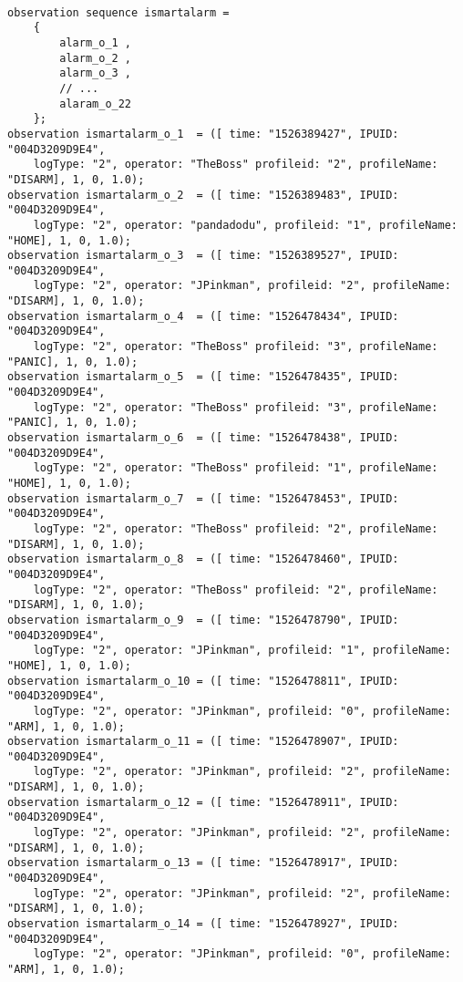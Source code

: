 \documentclass{easychair}
\begin{document}
\lstset{language=Lucid}
\lstset{frame=lines}
\lstset{basicstyle=\footnotesize}
\begin{lstlisting}

observation sequence ismartalarm =
	{	
		alarm_o_1 ,
		alarm_o_2 ,
		alarm_o_3 ,
		// ...
		alaram_o_22
	};
observation ismartalarm_o_1	 = ([ time: "1526389427", IPUID: "004D3209D9E4",
	logType: "2", operator: "TheBoss" profileid: "2", profileName: "DISARM], 1, 0, 1.0);
observation ismartalarm_o_2	 = ([ time: "1526389483", IPUID: "004D3209D9E4",
	logType: "2", operator: "pandadodu", profileid: "1", profileName: "HOME], 1, 0, 1.0);
observation ismartalarm_o_3	 = ([ time: "1526389527", IPUID: "004D3209D9E4",
	logType: "2", operator: "JPinkman", profileid: "2", profileName: "DISARM], 1, 0, 1.0);
observation ismartalarm_o_4	 = ([ time: "1526478434", IPUID: "004D3209D9E4",
	logType: "2", operator: "TheBoss" profileid: "3", profileName: "PANIC], 1, 0, 1.0);
observation ismartalarm_o_5	 = ([ time: "1526478435", IPUID: "004D3209D9E4",
	logType: "2", operator: "TheBoss" profileid: "3", profileName: "PANIC], 1, 0, 1.0);
observation ismartalarm_o_6	 = ([ time: "1526478438", IPUID: "004D3209D9E4",
	logType: "2", operator: "TheBoss" profileid: "1", profileName: "HOME], 1, 0, 1.0);
observation ismartalarm_o_7	 = ([ time: "1526478453", IPUID: "004D3209D9E4",
	logType: "2", operator: "TheBoss" profileid: "2", profileName: "DISARM], 1, 0, 1.0);
observation ismartalarm_o_8	 = ([ time: "1526478460", IPUID: "004D3209D9E4",
	logType: "2", operator: "TheBoss" profileid: "2", profileName: "DISARM], 1, 0, 1.0);
observation ismartalarm_o_9	 = ([ time: "1526478790", IPUID: "004D3209D9E4",
	logType: "2", operator: "JPinkman", profileid: "1", profileName: "HOME], 1, 0, 1.0);
observation ismartalarm_o_10 = ([ time: "1526478811", IPUID: "004D3209D9E4",
	logType: "2", operator: "JPinkman", profileid: "0", profileName: "ARM], 1, 0, 1.0);
observation ismartalarm_o_11 = ([ time: "1526478907", IPUID: "004D3209D9E4",
	logType: "2", operator: "JPinkman", profileid: "2", profileName: "DISARM], 1, 0, 1.0);
observation ismartalarm_o_12 = ([ time: "1526478911", IPUID: "004D3209D9E4",
	logType: "2", operator: "JPinkman", profileid: "2", profileName: "DISARM], 1, 0, 1.0);
observation ismartalarm_o_13 = ([ time: "1526478917", IPUID: "004D3209D9E4",
	logType: "2", operator: "JPinkman", profileid: "2", profileName: "DISARM], 1, 0, 1.0);
observation ismartalarm_o_14 = ([ time: "1526478927", IPUID: "004D3209D9E4",
	logType: "2", operator: "JPinkman", profileid: "0", profileName: "ARM], 1, 0, 1.0);

\end{lstlisting}
\end{document}
